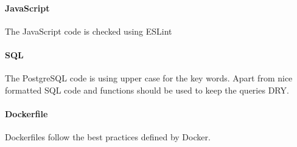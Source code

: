\paragraph{JavaScript} The JavaScript code is checked using ESLint\cite{pm_13_eslint.org_2015}

\paragraph{SQL} The PostgreSQL code is using upper case for the key words. Apart from nice formatted SQL code and functions should be used
to keep the queries DRY\cite{pm_14_wikipedia_2015}.

\paragraph{Dockerfile} Dockerfiles follow the best practices\cite{pm_15_docs.docker.com_2015} defined by Docker.


